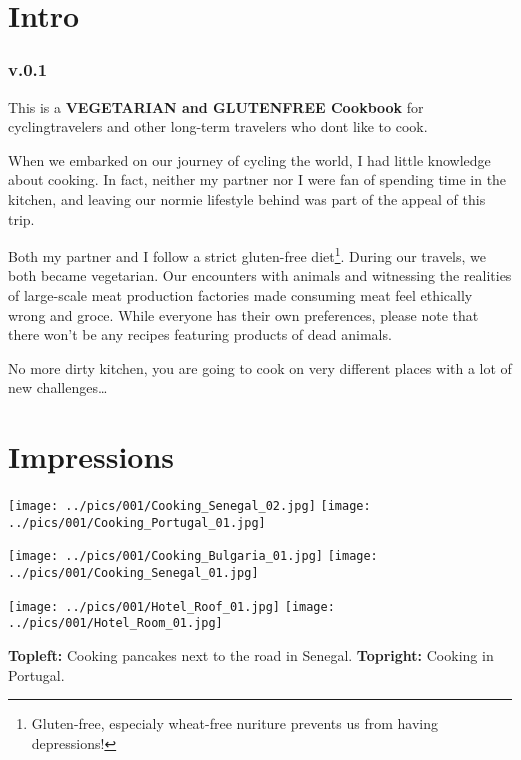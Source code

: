 \documentclass[
]{article}
\author{}
\date{}
\begin{document}
\section{Intro}\label{intro}

\subsubsection{v.0.1}\label{v.0.1}

This is a \textbf{VEGETARIAN and GLUTENFREE Cookbook} for
cyclingtravelers and other long-term travelers who dont like to cook.

When we embarked on our journey of cycling the world, I had little
knowledge about cooking. In fact, neither my partner nor I were fan of
spending time in the kitchen, and leaving our normie lifestyle behind
was part of the appeal of this trip.

Both my partner and I follow a strict gluten-free diet\footnote{Gluten-free,
  especialy wheat-free nuriture prevents us from having depressions!}.
During our travels, we both became vegetarian. Our encounters with
animals and witnessing the realities of large-scale meat production
factories made consuming meat feel ethically wrong and groce. While
everyone has their own preferences, please note that there won't be any
recipes featuring products of dead animals.

No more dirty kitchen, you are going to cook on very different places
with a lot of new challenges\ldots{}

\newpage

\section{Impressions}\label{impressions}

\texttt{[image: ../pics/001/Cooking\_Senegal\_02.jpg]}
\texttt{[image: ../pics/001/Cooking\_Portugal\_01.jpg]}

\texttt{[image: ../pics/001/Cooking\_Bulgaria\_01.jpg]}
\texttt{[image: ../pics/001/Cooking\_Senegal\_01.jpg]}

\texttt{[image: ../pics/001/Hotel\_Roof\_01.jpg]}
\texttt{[image: ../pics/001/Hotel\_Room\_01.jpg]}

\textbf{Topleft:} Cooking pancakes next to the road in Senegal.
\textbf{Topright:} Cooking in Portugal.
\end{document}
